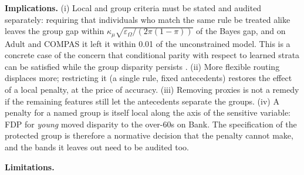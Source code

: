 \documentclass[pdflatex,sn-basic,Numbered,lineno]{sn-jnl}
\begin{document}
\textbf{Implications.} (i) Local and group criteria must be stated and audited separately: requiring that individuals who match the same rule be treated alike leaves the group gap within \(\kappa_\mu\sqrt{\varepsilon_\Omega/(2\pi(1-\pi))}\) of the Bayes gap, and on Adult and COMPAS it left it within 0.01 of the unconstrained model. This is a concrete case of the concern that conditional parity with respect to learned strata can be satisfied while the group disparity persists \cite{lipton,kearns}. (ii) More flexible routing displaces more; restricting it (a single rule, fixed antecedents) restores the effect of a local penalty, at the price of accuracy. (iii) Removing proxies is not a remedy if the remaining features still let the antecedents separate the groups. (iv) A penalty for a named group is itself local along the axis of the sensitive variable: FDP for \emph{young} moved disparity to the over-60s on Bank. The specification of the protected group is therefore a normative decision that the penalty cannot make, and the bands it leaves out need to be audited too.

\textbf{Limitations.}
\end{document}
